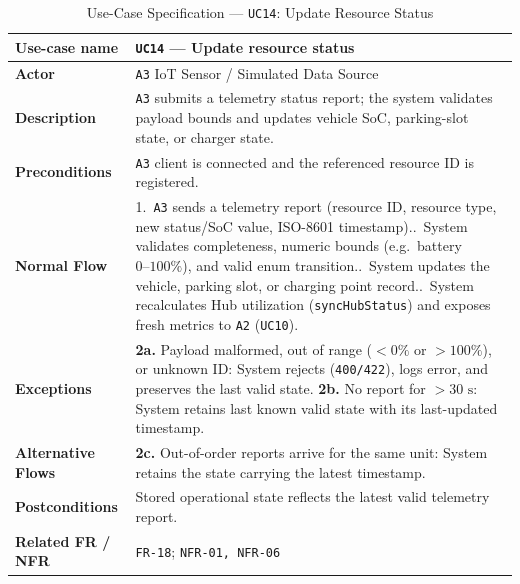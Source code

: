 \begin{table}[H]
  \centering
  \singlespacing\footnotesize
  \caption{Use-Case Specification --- \texttt{UC14}: Update Resource Status}
  \label{tab:uc14}
  \renewcommand{\arraystretch}{1.13}
  \begin{tabularx}{\textwidth}{|L{2.9cm}|Y|}
    \hline
    \textbf{Use-case name} & \textbf{\texttt{UC14} --- Update resource status} \\
    \hline
    \textbf{Actor} & \texttt{A3} IoT Sensor / Simulated Data Source \\
    \hline
    \textbf{Description} & \texttt{A3} submits a telemetry status report; the system validates payload bounds and updates vehicle SoC, parking-slot state, or charger state. \\
    \hline
    \textbf{Preconditions} & \texttt{A3} client is connected and the referenced resource ID is registered. \\
    \hline
    \textbf{Normal Flow} & 1.\ \texttt{A3} sends a telemetry report (resource ID, resource type, new status/SoC value, ISO-8601 timestamp)..\ System validates completeness, numeric bounds (e.g.\ battery $0\text{--}100\%$), and valid enum transition..\ System updates the vehicle, parking slot, or charging point record..\ System recalculates Hub utilization (\texttt{syncHubStatus}) and exposes fresh metrics to \texttt{A2} (\texttt{UC10}). \\
    \hline
    \textbf{Exceptions} & \textbf{2a.} Payload malformed, out of range ($<0\%$ or $>100\%$), or unknown ID: System rejects (\texttt{400/422}), logs error, and preserves the last valid state.\newline
    \textbf{2b.} No report for $>30\text{ s}$: System retains last known valid state with its last-updated timestamp. \\
    \hline
    \textbf{Alternative Flows} & \textbf{2c.} Out-of-order reports arrive for the same unit: System retains the state carrying the latest timestamp. \\
    \hline
    \textbf{Postconditions} & Stored operational state reflects the latest valid telemetry report. \\
    \hline
    \textbf{Related FR / NFR} & \texttt{FR-18}; \texttt{NFR-01, NFR-06} \\
    \hline
  \end{tabularx}
\end{table}

